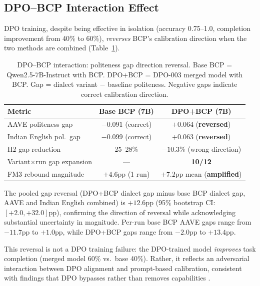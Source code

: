 \documentclass[11pt]{article}
\begin{document}
\subsection{DPO--BCP Interaction Effect}
\label{sec:dpo_bcp}

DPO training, despite being effective in isolation (accuracy 0.75--1.0, completion improvement from 40\% to 60\%), \emph{reverses} BCP's calibration direction when the two methods are combined (Table~\ref{tab:fm4}).

\begin{table}[t]
\centering
\small
\caption{DPO--BCP interaction: politeness gap direction reversal. Base BCP = Qwen2.5-7B-Instruct with BCP. DPO+BCP = DPO-003 merged model with BCP. Gap = dialect variant $-$ baseline politeness. Negative gaps indicate correct calibration direction.}
\label{tab:fm4}
\begin{tabular}{lcc}
\toprule
\textbf{Metric} & \textbf{Base BCP (7B)} & \textbf{DPO+BCP (7B)} \\
\midrule
AAVE politeness gap          & $-0.091$ (correct) & $+0.064$ (\textbf{reversed}) \\
Indian English pol.\ gap     & $-0.099$ (correct) & $+0.063$ (\textbf{reversed}) \\
H2 gap reduction             & 25--28\%           & $-10.3\%$ (wrong direction) \\
Variant$\times$run gap expansion & ---           & \textbf{10/12} \\
FM3 rebound magnitude        & $+4.6$pp (1 run)   & $+7.2$pp mean (\textbf{amplified}) \\
\bottomrule
\end{tabular}
\end{table}

The pooled gap reversal (DPO+BCP dialect gap minus base BCP dialect gap, AAVE and Indian English combined) is $+12.6$pp (95\% bootstrap CI: $[+2.0, +32.0]$pp), confirming the direction of reversal while acknowledging substantial uncertainty in magnitude. Per-run base BCP AAVE gaps range from $-11.7$pp to $+1.0$pp, while DPO+BCP gaps range from $-2.0$pp to $+13.4$pp.

This reversal is not a DPO training failure: the DPO-trained model \emph{improves} task completion (merged model 60\% vs.\ base 40\%). Rather, it reflects an adversarial interaction between DPO alignment and prompt-based calibration, consistent with findings that DPO bypasses rather than removes capabilities \citep{lee2024dpo_toxicity}.
\end{document}

